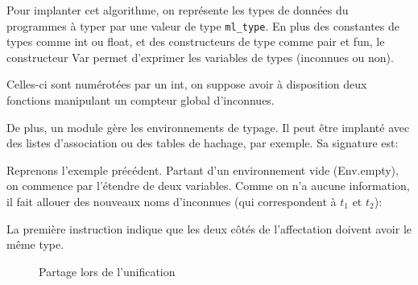 


Pour implanter cet algorithme, on représente les types de données du programmes
à typer par une valeur de type \texttt{ml\_type}. En plus des constantes de
types comme int ou float, et des constructeurs de type comme pair et fun, le
constructeur Var permet d'exprimer les variables de types (inconnues ou non).

Celles-ci sont numérotées par un int, on suppose avoir à disposition deux
fonctions manipulant un compteur global d'inconnues.


De plus, un module gère les environnements de typage. Il peut être implanté avec
des listes d'association ou des tables de hachage, par exemple. Sa signature
est:


Reprenons l'exemple précédent. Partant d'un environnement vide (Env.empty), on
commence par l'étendre de deux variables. Comme on n'a aucune information, il
fait allouer des nouveaux noms d'inconnues (qui correspondent à $t_1$ et $t_2$):


La première instruction indique que les deux côtés de l'affectation doivent
avoir le même type.


\begin{figure}
  \centering
  \caption{Partage lors de l'unification}
\label{fig:unifsharing}
\end{figure}

